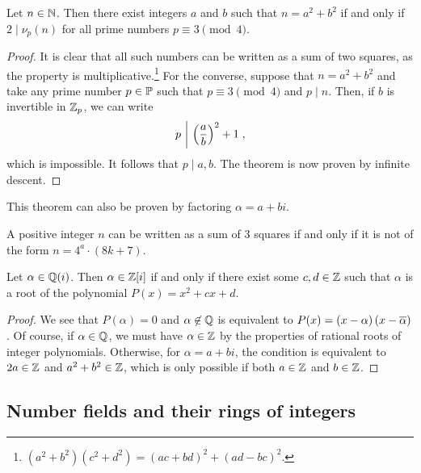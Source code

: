 \begin{izrek}
Let $n \in \N$. Then there exist integers $a$ and $b$ such that
$n = a^2 + b^2$ if and only if $2 \mid \nu_p(n)$ for all prime
numbers $p \equiv 3 \pmod{4}$.
\end{izrek}

\begin{proof}
It is clear that all such numbers can be written as a sum of two
squares, as the property is
multiplicative.\footnote{$(a^2+b^2)(c^2+d^2) =
(ac+bd)^2 + (ad-bc)^2$.} For the converse, suppose that
$n = a^2 + b^2$ and take any prime number $p \in \P$ such that
$p \equiv 3 \pmod{4}$ and $p \mid n$. Then, if $b$ is invertible in
$\Z_p$, we can write
\[
\left.p~\middle\vert~\br{\frac{a}{b}}^2 + 1\right.,
\]
which is impossible. It follows that $p \mid a, b$. The theorem is
now proven by infinite descent.
\end{proof}

\begin{opomba}
This theorem can also be proven by factoring $\alpha = a + bi$.
\end{opomba}

\begin{opomba}
A positive integer $n$ can be written as a sum of $3$ squares if
and only if it is not of the form $n = 4^a \cdot (8k+7)$.
\end{opomba}

\begin{trditev}
Let $\alpha \in \Q(i)$. Then $\alpha \in \Z[i]$ if and only if
there exist some $c, d \in \Z$ such that $\alpha$ is a root of the
polynomial $P(x) = x^2 + cx + d$.
\end{trditev}

\begin{proof}
We see that $P(\alpha) = 0$ and $\alpha \not \in \Q$ is equivalent
to $P(x) = (x - \alpha) \br{x - \oline{\alpha}}$. Of course, if
$\alpha \in \Q$, we must have $\alpha \in \Z$ by the properties of
rational roots of integer polynomials. Otherwise, for
$\alpha = a + bi$, the condition is equivalent to $2a \in \Z$ and
$a^2 + b^2 \in \Z$, which is only possible if both $a \in \Z$ and
$b \in \Z$.
\end{proof}

\newpage

\subsection{Number fields and their rings of integers}

